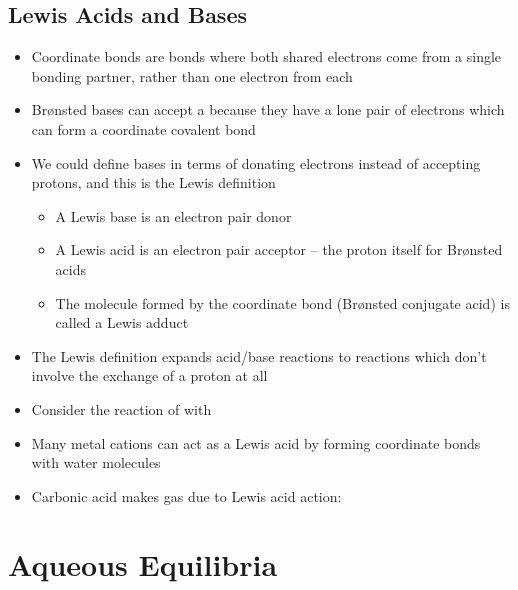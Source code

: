 \documentclass[12pt, openany, letterpaper]{memoir}
\begin{document}
\section{Lewis Acids and Bases}
\begin{itemize}
	\item Coordinate bonds are bonds where both shared electrons come from a single bonding partner, rather than one electron from each
	\item Br\o nsted bases can accept a  because they have a lone pair of electrons which can form a coordinate covalent bond
	\item We could define bases in terms of donating electrons instead of accepting protons, and this is the Lewis definition
	\begin{itemize}
		\item A Lewis base is an electron pair donor
		\item A Lewis acid is an electron pair acceptor -- the proton itself for Br\o nsted acids
		\item The molecule formed by the coordinate bond (Br\o nsted conjugate acid) is called a Lewis adduct
	\end{itemize}
	\item The Lewis definition expands acid/base reactions to reactions which don't involve the exchange of a proton at all
	\item Consider the reaction of  with 
	\item Many metal cations can act as a Lewis acid by forming coordinate bonds with water molecules
	
	\item Carbonic acid makes gas due to Lewis acid action: 
\end{itemize}

\chapter{Aqueous Equilibria}
\end{document}
